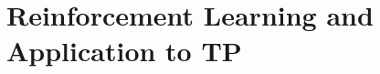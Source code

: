 \documentclass{beamer}
\begin{document}


\section{Reinforcement Learning and Application to TP}
\end{document}
